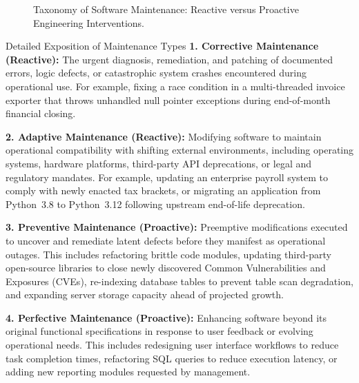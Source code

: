 \documentclass[11pt,a4paper]{article}
\begin{document}
\begin{figure}[htbp]
\caption{Taxonomy of Software Maintenance: Reactive versus Proactive Engineering Interventions.}
\label{fig:maintenance_taxonomy}
\end{figure}

\begin{conceptcard}{Detailed Exposition of Maintenance Types}
\textbf{1. Corrective Maintenance (Reactive):} The urgent diagnosis, remediation, and patching of documented errors, logic defects, or catastrophic system crashes encountered during operational use. For example, fixing a race condition in a multi-threaded invoice exporter that throws unhandled null pointer exceptions during end-of-month financial closing.

\textbf{2. Adaptive Maintenance (Reactive):} Modifying software to maintain operational compatibility with shifting external environments, including operating systems, hardware platforms, third-party API deprecations, or legal and regulatory mandates. For example, updating an enterprise payroll system to comply with newly enacted tax brackets, or migrating an application from Python~3.8 to Python~3.12 following upstream end-of-life deprecation.

\textbf{3. Preventive Maintenance (Proactive):} Preemptive modifications executed to uncover and remediate latent defects before they manifest as operational outages. This includes refactoring brittle code modules, updating third-party open-source libraries to close newly discovered Common Vulnerabilities and Exposures (CVEs), re-indexing database tables to prevent table scan degradation, and expanding server storage capacity ahead of projected growth.

\textbf{4. Perfective Maintenance (Proactive):} Enhancing software beyond its original functional specifications in response to user feedback or evolving operational needs. This includes redesigning user interface workflows to reduce task completion times, refactoring SQL queries to reduce execution latency, or adding new reporting modules requested by management.
\end{conceptcard}
\end{document}
